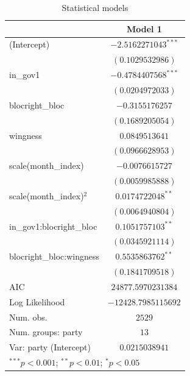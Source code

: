 
\begin{table}
\begin{center}
\begin{tabular}{l c}
\hline
 & Model 1 \\
\hline
(Intercept)              & $-2.5162271043^{***}$ \\
                         & $(0.1029532986)$      \\
in\_gov1                 & $-0.4784407568^{***}$ \\
                         & $(0.0204972033)$      \\
blocright\_bloc          & $-0.3155176257$       \\
                         & $(0.1689205054)$      \\
wingness                 & $0.0849513641$        \\
                         & $(0.0966628953)$      \\
scale(month\_index)      & $-0.0076615727$       \\
                         & $(0.0059985888)$      \\
scale(month\_index)$^2$  & $0.0174722048^{**}$   \\
                         & $(0.0064940804)$      \\
in\_gov1:blocright\_bloc & $0.1051757103^{**}$   \\
                         & $(0.0345921114)$      \\
blocright\_bloc:wingness & $0.5535863762^{**}$   \\
                         & $(0.1841709518)$      \\
\hline
AIC                      & $24877.5970231384$    \\
Log Likelihood           & $-12428.7985115692$   \\
Num. obs.                & $2529$                \\
Num. groups: party       & $13$                  \\
Var: party (Intercept)   & $0.0215038941$        \\
\hline
\multicolumn{2}{l}{\scriptsize{$^{***}p<0.001$; $^{**}p<0.01$; $^{*}p<0.05$}}
\end{tabular}
\caption{Statistical models}
\label{table:coefficients}
\end{center}
\end{table}
